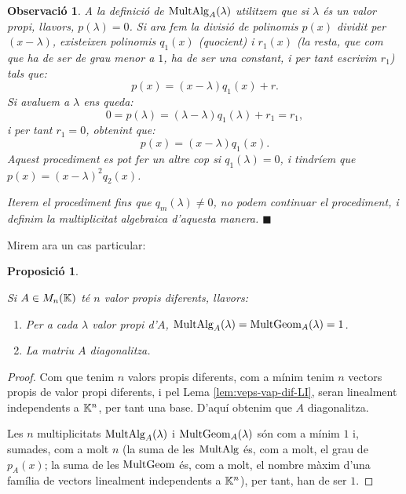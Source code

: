 \documentclass[
  11pt,
]{book}
\numberwithin{dummy}{section}
\theoremstyle{maincolornumbox}
\newtheorem{remarkT}{Observació}[chapter]
\theoremstyle{blacknumex}
\theoremstyle{blacknumbox}
\theoremstyle{maincolornum}
\newtheorem{propositionT}{Proposició}[chapter]
\newenvironment{proposition}{\begin{pBox}\begin{propositionT}}{\end{propositionT}\end{pBox}}
\newenvironment{remark}{\begin{remarkT}}{\hfill{\tiny\ensuremath{\blacksquare}}\end{remarkT}}
\begin{document}
\begin{remark}
A la definició de \(\operatorname{MultAlg}_A(\lambda)\) utilitzem que si \(\lambda\) és un
valor propi, llavors, \(p(\lambda)=0\). Si ara fem la divisió de polinomis
\(p(x)\) dividit per \((x-\lambda)\), existeixen polinomis \(q_1(x)\)
(quocient) i \(r_1(x)\) (la resta, que com que ha de ser de grau menor a
\(1\), ha de ser una constant, i per tant escrivim \(r_1\)) tals que:
\[p(x)=(x-\lambda)q_1(x)+r.\] Si avaluem a \(\lambda\) ens queda:
\[0=p(\lambda)=(\lambda-\lambda)q_1(\lambda)+r_1=r_1 ,\] i per tant
\(r_1=0\), obtenint que: \[p(x)=(x-\lambda)q_1(x).\] Aquest procediment es
pot fer un altre cop si \(q_1(\lambda)=0\), i tindríem que
\(p(x)=(x-\lambda)^2q_2(x)\).

Iterem el procediment fins que \(q_m(\lambda)\neq0\), no podem continuar
el procediment, i definim la multiplicitat algebraica d'aquesta manera.
\end{remark}

Mirem ara un cas particular:

\begin{proposition}
\protect\hypertarget{prp:n-vaps-diferents}{}\label{prp:n-vaps-diferents}

Si
\(A \in M_n(\mathbb{K})\) té \(n\) valor propis diferents, llavors:

\begin{enumerate}
\def\labelenumi{\arabic{enumi}.}
\item
  Per a cada \(\lambda\) valor propi d'\(A\),
  \(\operatorname{MultAlg}_A(\lambda)=\operatorname{MultGeom}_A(\lambda)=1\).
\item
  La matriu \(A\) diagonalitza.
\end{enumerate}

\end{proposition}

\begin{proof}
Com que tenim \(n\) valors propis diferents, com a mínim tenim
\(n\) vectors propis de valor propi diferents, i pel Lema
\ref{lem:veps-vap-dif-LI}, seran linealment independents a
\(\mathbb{K}^n\), per tant una base. D'aquí obtenim que \(A\) diagonalitza.

Les \(n\) multiplicitats \(\operatorname{MultAlg}_A(\lambda)\) i \(\operatorname{MultGeom}_A(\lambda)\)
són com a mínim \(1\) i, sumades, com a molt \(n\) (la suma de les
\(\operatorname{MultAlg}\) és, com a molt, el grau de \(p_A(x)\); la suma de les
\(\operatorname{MultGeom}\) és, com a molt, el nombre màxim d'una família de vectors
linealment independents a \(\mathbb{K}^n\)), per tant, han de ser \(1\).
\end{proof}
\end{document}
